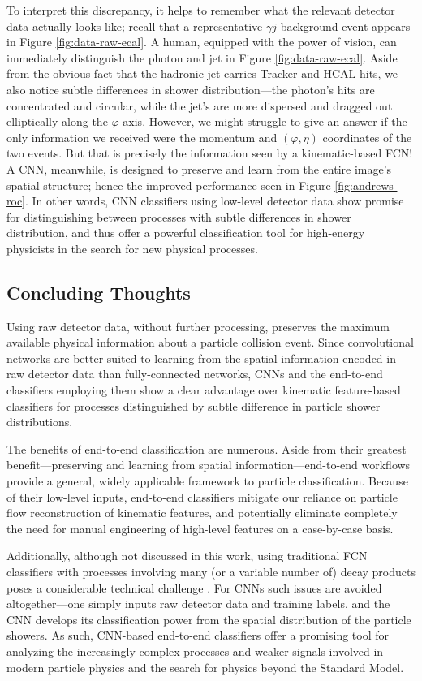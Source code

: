 \documentclass[11pt, a4paper]{article}
\begin{document}
To interpret this discrepancy, it helps to remember what the relevant detector data actually looks like; recall that a representative $ \gamma j $ background event appears in Figure \ref{fig:data-raw-ecal}.
A human, equipped with the power of vision, can immediately distinguish the photon and jet in Figure \ref{fig:data-raw-ecal}.
Aside from the obvious fact that the hadronic jet carries Tracker and HCAL hits, we also notice subtle differences in shower distribution---the photon's hits are concentrated and circular, while the jet's are more dispersed and dragged out elliptically along the $ \varphi $ axis.
However, we might struggle to give an answer if the only information we received were the momentum and $ (\varphi, \eta) $ coordinates of the two events.
But that is precisely the information seen by a kinematic-based FCN! A CNN, meanwhile, is designed to preserve and learn from the entire image's spatial structure; hence the improved performance seen in Figure \ref{fig:andrews-roc}.
In other words, CNN classifiers using low-level detector data show promise for distinguishing between processes with subtle differences in shower distribution, and thus offer a powerful classification tool for high-energy physicists in the search for new physical processes.

\subsection{Concluding Thoughts}
Using raw detector data, without further processing, preserves the maximum available physical information about a particle collision event.
Since convolutional networks are better suited to learning from the spatial information encoded in raw detector data than fully-connected networks, CNNs and the end-to-end classifiers employing them show a clear advantage over kinematic feature-based classifiers for processes distinguished by subtle difference in particle shower distributions.

The benefits of end-to-end classification are numerous.
Aside from their greatest benefit---preserving and learning from spatial information---end-to-end workflows provide a general, widely applicable framework to particle classification.
Because of their low-level inputs, end-to-end classifiers mitigate our reliance on particle flow reconstruction of kinematic features, and potentially eliminate completely the need for manual engineering of high-level features on a case-by-case basis.

Additionally, although not discussed in this work, using traditional FCN classifiers with processes involving many (or a variable number of) decay products poses a considerable technical challenge \cite{andrews-higgs}.
For CNNs such issues are avoided altogether---one simply inputs raw detector data and training labels, and the CNN develops its classification power from the spatial distribution of the particle showers.
As such, CNN-based end-to-end classifiers offer a promising tool for analyzing the increasingly complex processes and weaker signals involved in modern particle physics and the search for physics beyond the Standard Model.
\end{document}
